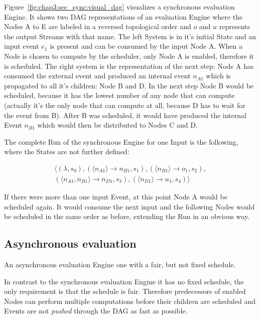 Figure~\ref{fig:chap3:sec_sync:visual_dag} visualizes a synchronous evaluation Engine.
It shows two DAG representations of an evaluation Engine  where the Nodes A to E are labeled in a reversed topological order and \(o\) and \(u\) represents the output Streams with that name.
The left System is in it's initial State and an input event \(e_1\) is present and can be consumed by the input Node A.
When a Node is chosen to compute by the scheduler, only Node A is enabled, therefore it is scheduled.
The right system is the representation of the next step: Node A has consumed the external event and produced an internal event \(n_{A1}\) which is propagated to all it's children: Node B and D.
In the next step Node B would be scheduled, because it has the lowest number of any node that can compute (actually it's the only node that can compute at all, because D has to wait for the event from B).
After B was scheduled, it would have produced the internal Event \(n_{B1}\) which would then be distributed to Nodes C and D.

The complete Run of the synchronous Engine for one Input is the following, where the States are not further defined:

\begin{align*}
  \langle
    (\lambda,                                           s_0),
    (\langle n_{A1}         \rangle\rightarrow n_{B1},  s_1),
    (\langle n_{B1}         \rangle\rightarrow o_1,     s_2),\\
    (\langle n_{A1}, n_{B1} \rangle\rightarrow n_{D1},  s_3),
    (\langle n_{D1}         \rangle\rightarrow u_1,     s_4)
  \rangle
\end{align*}

If there were more than one input Event, at this point Node A would be scheduled again.
It would consume the next input and the following Nodes would be scheduled in the same order as before, extending the Run in an obvious way.

\subsection{Asynchronous evaluation}
\label{sec:concepts:behaviour_without_timing:async}

An asynchronous evaluation Engine one with a fair, but not fixed schedule.

In contrast to the synchronous evaluation Engine it has no fixed schedule, the only requirement is that the schedule is fair.
Therefore predecessors of enabled Nodes can perform multiple computations before their children are scheduled and Events are not \emph{pushed} through the DAG as fast as possible.

